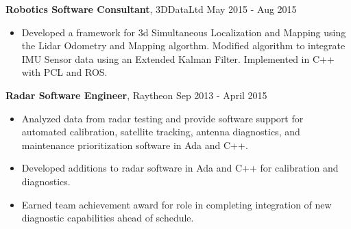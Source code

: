\documentclass{article} %
\newcommand{\rjob}[2]{
  \hspace*{-0.3cm}
{\fontsize{10pt}{12pt}\selectfont #1} \hfill #2 
\vspace*{0.1cm} 
\hspace*{-1.2cm}
}
\newenvironment{ritemize}{
\hspace*{-0.8cm} 
\begin{minipage}{1.05\linewidth}
\begin{itemize}
}{
\end{itemize}
\end{minipage}
}
\newcommand{\ritem}{
\item[-]
}
\begin{document}
\rjob{\textbf{Robotics Software Consultant}, 3DDataLtd}{May 2015 - Aug 2015}\\
\begin{ritemize}
\ritem Developed a framework for 3d Simultaneous Localization and Mapping using the Lidar Odometry and Mapping algorthm. Modified algorithm to integrate IMU Sensor data using an Extended Kalman Filter. Implemented in C++ with PCL and ROS.
\end{ritemize}

\rjob{\textbf{Radar Software Engineer}, Raytheon}{Sep 2013 - April 2015}\\
\begin{ritemize}
\ritem Analyzed data from radar testing and provide software support for automated calibration, satellite tracking, antenna diagnostics, and maintenance prioritization software in Ada and C++.
\ritem Developed additions to radar software in Ada and C++ for calibration and diagnostics.
\ritem Earned team achievement award for role in completing integration of new diagnostic capabilities ahead of schedule.
\end{ritemize}








\end{document}
